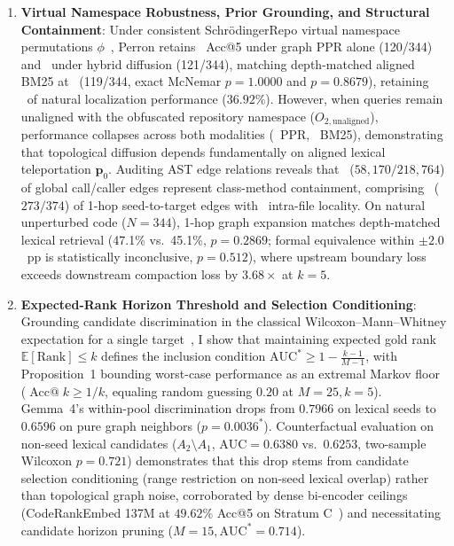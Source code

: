 \documentclass[10pt]{article}
\begin{document}
\begin{enumerate}[noitemsep,topsep=1pt,parsep=0pt,partopsep=0pt]\sloppy
    \item \textbf{Virtual Namespace Robustness, Prior Grounding, and Structural Containment}: Under consistent Schr{\"o}dingerRepo virtual namespace permutations $\phi$~\cite{chen2024schrodinger}, Perron retains \HonestLevelTwoConsistentPPRAccFive\ Acc@5 under graph PPR alone (120/344) and \HonestLevelTwoConsistentHybridAccFive\ under hybrid diffusion (121/344), matching depth-matched aligned BM25 at \HonestLevelTwoConsistentBMTwentyFiveAccFive\ (119/344, exact McNemar $p=1.0000$ and $p=0.8679$), retaining \HonestLevelTwoConsistentPPRRetentionPct\ of natural localization performance ($36.92\%$). However, when queries remain unaligned with the obfuscated repository namespace ($O_{2,\text{unaligned}}$), performance collapses across both modalities (\HonestLevelTwoUnalignedPPRAccFive\ PPR, \HonestLevelTwoUnalignedBMTwentyFiveAccFive\ BM25), demonstrating that topological diffusion depends fundamentally on aligned lexical teleportation $\mathbf{p}_0$. Auditing AST edge relations reveals that \HonestContainmentGlobalFraction\ ($58{,}170/218{,}764$) of global call/caller edges represent class-method containment, comprising \HonestContainmentOneHopPct\ ($273/374$) of 1-hop seed-to-target edges with \HonestContainmentOneHopIntraFilePct\ intra-file locality. On natural unperturbed code ($N=344$), 1-hop graph expansion matches depth-matched lexical retrieval (47.1\% vs.\ 45.1\%, $p=0.2869$; formal equivalence within $\pm 2.0$~pp is statistically inconclusive, $p=0.512$), where upstream boundary loss exceeds downstream compaction loss by $3.68\times$ at $k=5$.
    \item \textbf{Expected-Rank Horizon Threshold and Selection Conditioning}: Grounding candidate discrimination in the classical Wilcoxon--Mann--Whitney expectation for a single target~\cite{bamber1975area}, I show that maintaining expected gold rank $\mathbb{E}[\text{Rank}] \le k$ defines the inclusion condition $\text{AUC}^* \ge 1 - \frac{k-1}{M-1}$, with Proposition~1 bounding worst-case performance as an extremal Markov floor ($\operatorname{Acc@}k \ge 1/k$, equaling random guessing $0.20$ at $M=25, k=5$). Gemma~4's within-pool discrimination drops from $0.7966$ on lexical seeds to $0.6596$ on pure graph neighbors ($p = 0.0036^*$). Counterfactual evaluation on non-seed lexical candidates ($A_2 \setminus A_1$, $\text{AUC}=0.6380$ vs.\ $0.6253$, two-sample Wilcoxon $p=0.721$) demonstrates that this drop stems from candidate selection conditioning (range restriction on non-seed lexical overlap) rather than topological graph noise, corroborated by dense bi-encoder ceilings (CodeRankEmbed 137M at $49.62\%$ Acc@5 on Stratum C~\cite{suresh2024coderankembed}) and necessitating candidate horizon pruning ($M=15, \text{AUC}^*=0.714$).

\end{enumerate}
\end{document}

